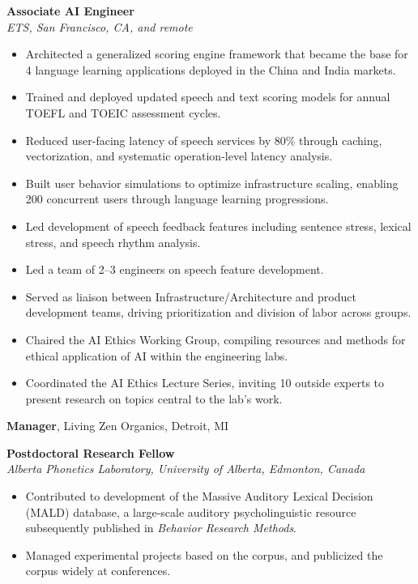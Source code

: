 \documentclass{article}
\newcommand{\entrysep}{\vspace{1.1em}}
\begin{document}
\begin{minipage}[t]{0.68\textwidth}
\entrysep
\textbf{Associate AI Engineer} \hfill {} \\
\textit{ETS, San Francisco, CA, and remote}
\begin{itemize}[leftmargin=1em, itemsep=0.2em, topsep=0.3em, parsep=0pt]
  \item Architected a generalized scoring engine framework that became the base for 4 language learning applications deployed in the China and India markets.
  \item Trained and deployed updated speech and text scoring models for annual TOEFL and TOEIC assessment cycles.
  \item Reduced user-facing latency of speech services by 80\% through caching, vectorization, and systematic operation-level latency analysis.
  \item Built user behavior simulations to optimize infrastructure scaling, enabling 200 concurrent users through language learning progressions.
  \item Led development of speech feedback features including sentence stress, lexical stress, and speech rhythm analysis.
  \item Led a team of 2--3 engineers on speech feature development.
  \item Served as liaison between Infrastructure/Architecture and product development teams, driving prioritization and division of labor across groups.
  \item Chaired the AI Ethics Working Group, compiling resources and methods for ethical application of AI within the engineering labs.
  \item Coordinated the AI Ethics Lecture Series, inviting 10 outside experts to present research on topics central to the lab's work.
\end{itemize}

\entrysep
\textbf{Manager}, Living Zen Organics, Detroit, MI \hfill {}

\entrysep
\textbf{Postdoctoral Research Fellow} \hfill {} \\
\textit{Alberta Phonetics Laboratory, University of Alberta, Edmonton, Canada}
\begin{itemize}[leftmargin=1em, itemsep=0.2em, topsep=0.3em, parsep=0pt]
  \item Contributed to development of the Massive Auditory Lexical Decision (MALD) database, a large-scale auditory psycholinguistic resource subsequently published in \textit{Behavior Research Methods}.
  \item Managed experimental projects based on the corpus, and publicized the corpus widely at conferences.
\end{itemize}

\end{minipage}
\end{document}
